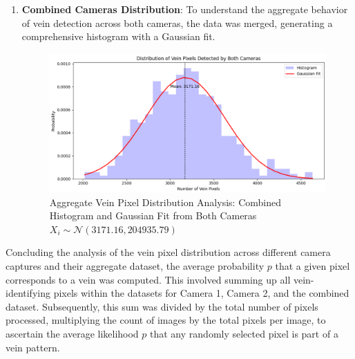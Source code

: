 \begin{enumerate}
    \newpage
    \item \textbf{Combined Cameras Distribution}: To understand the aggregate behavior of vein detection across both cameras, the data was merged, generating a comprehensive histogram with a Gaussian fit.

    \begin{figure}[H]
        \centering
        \includegraphics[width=1\linewidth]{latex-img/distribution_veins_bothcams.png}
        \caption{Aggregate Vein Pixel Distribution Analysis: Combined Histogram and Gaussian Fit from Both Cameras \(X_i \sim \mathcal{N}(3171.16, 204935.79)\)}
        \label{distribution_veins_bothcams}
    \end{figure}
\end{enumerate}


Concluding the analysis of the vein pixel distribution across different camera captures and their aggregate dataset, the average probability \(p\) that a given pixel corresponds to a vein was computed. This involved summing up all vein-identifying pixels within the datasets for Camera 1, Camera 2, and the combined dataset. Subsequently, this sum was divided by the total number of pixels processed, multiplying the count of images by the total pixels per image, to ascertain the average likelihood \(p\) that any randomly selected pixel is part of a vein pattern.

